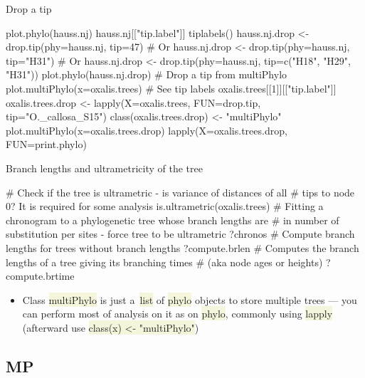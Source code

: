 \documentclass[compress, xelatex, 11pt, xcolor=svgnames, aspectratio=169,
	hyperref={
		bookmarks=true,
		unicode=true,
		colorlinks=true,
		pdftitle={Molecular data in R},
		plainpages=false,
		pdfauthor={Vojtech Zeisek},
		pdfsubject={Course about phylogeny and evolution in R},
		pdfcreator={XeLaTeX},
		pdfkeywords={R, evolution, phylogeny, molecular data},
		linkcolor=Crimson, %
		anchorcolor=Magenta, %
		citecolor=Magenta, %
		filecolor=Magenta, %
		menucolor=Magenta, %
		urlcolor=DodgerBlue, %
		},
	url={hyphens, lowtilde} %
	]{beamer}
\renewcommand{\texttt}[1]{\colorbox{Beige}{{\ttfamily #1}}}
\begin{document}
\begin{frame}[fragile]{Drop a tip}
	\begin{spluscode}
    plot.phylo(hauss.nj)
    hauss.nj[["tip.label"]]
    tiplabels()
    hauss.nj.drop <- drop.tip(phy=hauss.nj, tip=47) # Or
    hauss.nj.drop <- drop.tip(phy=hauss.nj, tip="H31") # Or
    hauss.nj.drop <- drop.tip(phy=hauss.nj, tip=c("H18", "H29", "H31"))
    plot.phylo(hauss.nj.drop)
    # Drop a tip from multiPhylo
    plot.multiPhylo(x=oxalis.trees)
    # See tip labels
    oxalis.trees[[1]][["tip.label"]]
    oxalis.trees.drop <- lapply(X=oxalis.trees, FUN=drop.tip,
      tip="O._callosa_S15")
    class(oxalis.trees.drop) <- "multiPhylo"
    plot.multiPhylo(x=oxalis.trees.drop)
    lapply(X=oxalis.trees.drop, FUN=print.phylo)
	\end{spluscode}
\end{frame}

\begin{frame}[fragile]{Branch lengths and ultrametricity of the tree}
	\begin{spluscode}
    # Check if the tree is ultrametric - is variance of distances of all
    # tips to node 0? It is required for some analysis
    is.ultrametric(oxalis.trees)
    # Fitting a chronogram to a phylogenetic tree whose branch lengths are
    # in number of substitution per sites - force tree to be ultrametric
    ?chronos
    # Compute branch lengths for trees without branch lengths
    ?compute.brlen
    # Computes the branch lengths of a tree giving its branching times
    # (aka node ages or heights)
    ?compute.brtime
	\end{spluscode}
	\begin{itemize}
		\item Class \texttt{multiPhylo} is just a~\texttt{list} of \texttt{phylo} objects to store multiple trees --- you can perform most of analysis on it as on \texttt{phylo}, commonly using \texttt{lapply} (afterward use \texttt{class(x) <- "multiPhylo"})
	\end{itemize}
\end{frame}

\subsection{MP}
\end{document}
